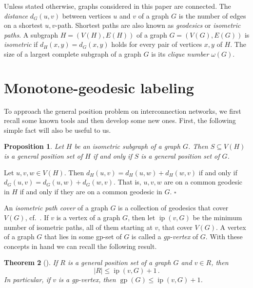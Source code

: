 \documentclass[12pt]{article}
\newtheorem{theorem}{Theorem}[section]
\newtheorem{proposition}[theorem]{Proposition}
\newcommand{\proof}{\noindent{\bf Proof.\ }}
\newcommand{\qed}{\hfill $\square$\medskip}
\DeclareMathOperator {\gp} {gp}
\DeclareMathOperator {\ip} {ip}
\begin{document}
Unless stated otherwise, graphs considered in this paper are connected. The {\em distance} $d_G(u,v)$ between vertices $u$ and $v$ of a graph $G$ is the number of edges on a shortest $u,v$-path. Shortest paths are also known as {\em geodesics} or {\em isometric paths}. A subgraph $H=(V(H),E(H))$ of a graph $G=(V(G),E(G))$ is {\em isometric} if $d_H(x,y) = d_G(x,y)$ holds for every pair of vertices $x,y$ of $H$. The size of a largest complete subgraph of a graph $G$ is its {\em clique number} $\omega(G)$. 

\section{Monotone-geodesic labeling}
\label{sec:monotone}

To approach the general position problem on interconnection networks, we first recall some known tools and then develop some new ones. First, the following simple fact will also be useful to us. 

\begin{proposition}
\label{prp:isometric}
Let $H$ be an isometric subgraph of a graph $G$. Then $S\subseteq V(H)$ is a general position set of $H$ if and only if $S$ is a general position set of $G$. 
\end{proposition}

\proof
Let $u,v,w\in V(H)$. Then $d_H(u,v) = d_H(u,w) + d_H(w,v)$ if and only if $d_G(u,v) = d_G(u,w) + d_G(w,v)$. That is, $u,v,w$ are on a common geodesic in $H$ if and only if they are on a common geodesic in $G$.  
\qed

An {\em isometric path cover} of a graph $G$ is a collection of geodesics that cover $V(G)$, cf.~\cite{Fitz99, pan-2006}. If $v$ is a vertex of a graph $G$, then let $\ip(v,G)$ be the minimum number of isometric paths, all of them starting at $v$, that cover $V(G)$. A vertex of a graph $G$ that lies in some gp-set of $G$ is called a {\em gp-vertex} of $G$. With these concepts in hand we can recall the following result. 

\begin{theorem} [\cite{MaKl-2017+}]
\label{thm:iso-v-path-gp}
If $R$ is a general position set of a graph $G$ and $v\in R$, then
\begin{equation}
\label{math:eq2}
|R| \leq \ip(v,G) + 1\,.
\end{equation}
In particular, if $v$ is a gp-vertex, then $\gp(G) \le \ip(v,G) + 1$. 
\end{theorem}
\end{document}
